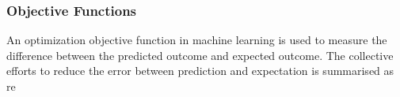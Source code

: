 \subsubsection{Objective Functions}
An optimization objective function in machine learning is used to measure the difference between the predicted outcome and expected outcome. The collective efforts to reduce the error between prediction and expectation is summarised as re